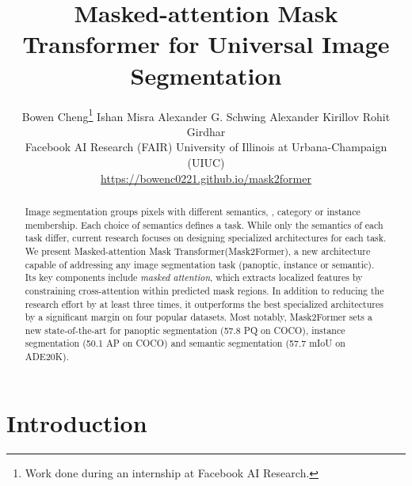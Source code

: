 \documentclass[10pt,twocolumn,letterpaper]{article}
\newcommand{\modelname}{Mask2Former\xspace}
\newcommand{\modelnamelong}{Masked-attention Mask Transformer\xspace}
\newcommand{\authorskip}{\hspace{2.5mm}}
\begin{document}
\title{\Large \modelnamelong for Universal Image Segmentation}




\author{
 Bowen Cheng\thanks{Work done during an internship at Facebook AI Research.} \authorskip Ishan Misra \authorskip Alexander G. Schwing \authorskip
 Alexander Kirillov \authorskip Rohit Girdhar \\
 Facebook AI Research (FAIR) \authorskip University of Illinois at Urbana-Champaign (UIUC) \\
{\small \url{https://bowenc0221.github.io/mask2former}}
}

\maketitle

\begin{abstract}

Image segmentation groups pixels with different semantics, \eg, category or instance membership. Each choice of semantics defines a task. While only the semantics of each task differ,
current research focuses on designing specialized architectures for each task.
We present \modelnamelong (\modelname), a new architecture capable of addressing any image segmentation task (panoptic, instance or semantic).
Its key components include \emph{masked attention}, which extracts localized features by constraining cross-attention within predicted mask regions. In addition to reducing the research effort by at least three times, it outperforms the best specialized architectures by a significant margin on four popular datasets.
Most notably, \modelname sets a new state-of-the-art for panoptic segmentation (57.8 PQ on COCO), instance segmentation (50.1 AP on COCO) and semantic segmentation (57.7 mIoU on ADE20K).
\end{abstract}







 

\vspace{-2mm}
\section{Introduction}
\end{document}
